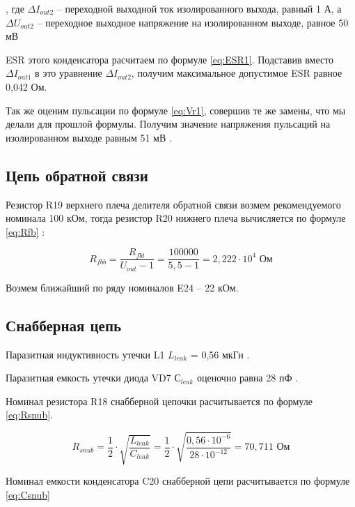 , где $\Delta I_{out2}$ -- переходной выходной ток изолированного выхода, равный 1 А, а $\Delta U_{out2}$ --
переходное выходное напряжение на изолированном выходе, равное 50 мВ

ESR этого конденсатора расчитаем по формуле \ref{eq:ESR1}.  Подставив вместо $\Delta I_{out1}$ 
в это уравнение $\Delta I_{out2}$, получим максимальное допустимое ESR равное 0,042 Ом.

Так же оценим пульсации по формуле \ref{eq:Vr1}, совершив те же замены, что мы делали для прошлой формулы. 
Получим значение напряжения пульсаций на изолированном выходе равным 51 мВ \cite{LMR36520:Aplication Note}. 


\subsection{Цепь обратной связи}
\hspace{1cm}

Резистор R19 верхнего плеча делителя обратной связи возмем рекомендуемого номинала 100 кОм, тогда резистор
R20 нижнего плеча вычисляется по формуле \ref{eq:Rfb} \cite{LMR36520:datasheet}:

\begin{equation}
   R_{fbb} = \frac{R_{fbt}}{U_{out} - 1} =
   \frac{100000}{5,5 - 1} = 2,222 \cdot 10^{4} \text{ Ом}
    \label{eq:Rfb}
\end{equation}

Возмем ближайший по ряду номиналов E24 -- 22 кОм. 


\subsection{Снабберная цепь}
\hspace{1cm}

Паразитная индуктивность утечки L1 $L_{leak}$ = 0,56 мкГн \cite{MSD1278:datasheet}. 

Паразитная емкость утечки диода VD7 $С_{leak}$ оценочно равна 28 пФ \cite{MBRS260T3G:datasheet}. 

Номинал резистора R18 снабберной цепочки расчитывается по формуле \ref{eq:Rsnub}.

\begin{equation}
    R_{snub} = \frac{1}{2} \cdot \sqrt{\frac{L_{leak}}{C_{leak}}} = 
    \frac{1}{2} \cdot \sqrt{\frac{0,56 \cdot 10^{-6}}{28 \cdot 10^{-12}}} =
    70,711 \text{ Ом}
    \label{eq:Rsnub}
 \end{equation}

Номинал емкости конденсатора C20 снабберной цепи расчитывается по формуле \ref{eq:Csnub}

